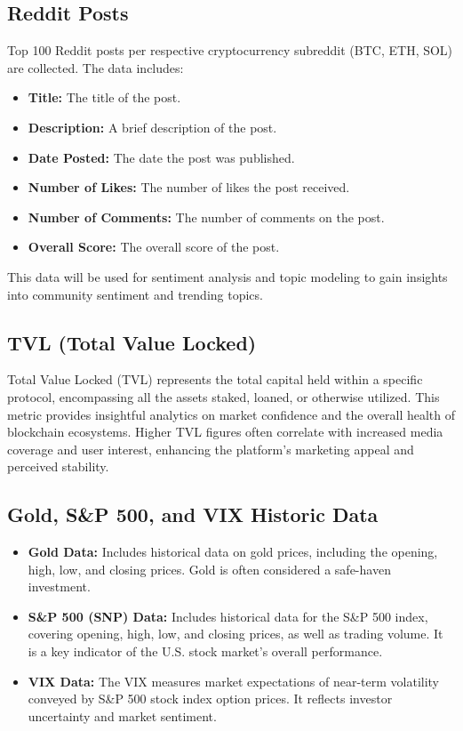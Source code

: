 \subsection{Reddit Posts}
Top 100 Reddit posts per respective cryptocurrency subreddit (BTC, ETH, SOL) are collected. The data includes:
\begin{itemize}
    \item \textbf{Title:} The title of the post.
    \item \textbf{Description:} A brief description of the post.
    \item \textbf{Date Posted:} The date the post was published.
    \item \textbf{Number of Likes:} The number of likes the post received.
    \item \textbf{Number of Comments:} The number of comments on the post.
    \item \textbf{Overall Score:} The overall score of the post.
\end{itemize}
This data will be used for sentiment analysis and topic modeling to gain insights into community sentiment and trending topics.

\subsection{TVL (Total Value Locked)}
Total Value Locked (TVL) represents the total capital held within a specific protocol, encompassing all the assets staked, loaned, or otherwise utilized. This metric provides insightful analytics on market confidence and the overall health of blockchain ecosystems. Higher TVL figures often correlate with increased media coverage and user interest, enhancing the platform's marketing appeal and perceived stability.

\subsection{Gold, S\&P 500, and VIX Historic Data}
\begin{itemize}
    \item \textbf{Gold Data:} Includes historical data on gold prices, including the opening, high, low, and closing prices. Gold is often considered a safe-haven investment.
    \item \textbf{S\&P 500 (SNP) Data:} Includes historical data for the S\&P 500 index, covering opening, high, low, and closing prices, as well as trading volume. It is a key indicator of the U.S. stock market's overall performance.
    \item \textbf{VIX Data:} The VIX measures market expectations of near-term volatility conveyed by S\&P 500 stock index option prices. It reflects investor uncertainty and market sentiment.
\end{itemize}

